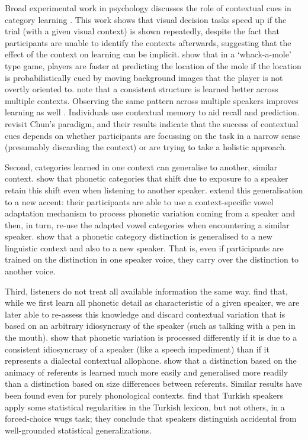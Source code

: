 \documentclass{frontiersSCNS} %
\begin{document}
Broad experimental work in psychology discusses the role of contextual cues in category learning \citep{chun1998contextual,goujon2015investigating}. This work shows that visual decision tasks speed up if the trial (with a given visual context) is shown repeatedly, despite the fact that participants are unable to identify the contexts afterwards, suggesting that the effect of the context on learning can be implicit. \cite{qian2014implicit} show that in a `whack-a-mole' type game, players are faster at predicting the location of the mole if the location is probabilistically cued by moving background images that the player is not overtly oriented to. \cite{gomez2002variability} note that a consistent structure is learned better across multiple contexts. Observing the same pattern across multiple speakers improves learning as well \citep{rost2009speaker}.   Individuals use contextual memory to aid recall and prediction. \cite{lleras2004spatial} revisit Chun's paradigm, and their results indicate that the success of contextual cues depends on whether participants are focussing on the task in a narrow sense (presumably discarding the context) or are trying to take a holistic approach.

Second, categories learned in one context can generalise to another, similar context. \cite{van2014cross} show that phonetic categories that shift due to exposure to a speaker retain this shift even when listening to another speaker. \cite{maye2008weckud} extend this generalisation to a new accent: their participants are able to use a context-specific vowel adaptation mechanism to process phonetic variation coming from a speaker and then, in turn, re-use the adapted vowel categories when encountering a similar speaker. \cite{kraljic2006generalization} show that a phonetic category distinction is generalised to a new linguistic context and also to a new speaker. That is, even if participants are trained on the distinction in one speaker voice, they carry over the distinction to another voice.

Third, listeners do not treat all available information the same way. \cite{kraljic2008} find that, while we first learn all phonetic detail as characteristic of a given speaker, we are later able to re-assess this knowledge and discard contextual variation that is based on an arbitrary idiosyncrasy of the speaker (such as talking with a pen in the mouth). \cite{kraljic2008accommodating} show that phonetic variation is processed differently if it is due to a consistent idiosyncrasy of a speaker (like a speech impediment) than if it represents a dialectal contextual allophone. \cite{leung2012constraints} show that a distinction based on the animacy of referents is learned much more easily and generalised more readily than a distinction based on size differences between referents. Similar results have been found even for purely phonological contexts.  \cite{becker2011} find that Turkish speakers apply some statistical regularities in the Turkish lexicon, but not others, in a forced-choice wugs task; they conclude that speakers distinguish accidental from well-grounded statistical generalizations.
\end{document}
